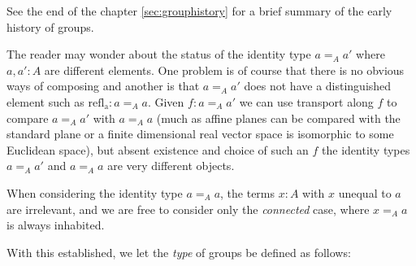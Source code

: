 See the end of the chapter \cref{sec:grouphistory} for a brief summary of the early history of groups.
\begin{remark}
  The reader may wonder about the status of the identity type $a=_Aa'$ where $a,a':A$ are different elements.  One problem is of course that there is no obvious ways of composing and another is that $a=_Aa'$ does not have a distinguished element such as $\mathrm{refl{}_a}:a=_Aa$.
Given $f:a=_Aa'$ we can use transport along $f$ to compare $a=_Aa'$ with $a=_Aa$ (much as affine planes can be compared with the standard plane or a finite dimensional real vector space is isomorphic to some Euclidean space), but absent existence and choice of such an $f$ the identity types $a=_Aa'$ and $a=_Aa$ are very different objects.
\end{remark}


\begin{remark}
  When considering the identity type $a=_Aa$, the terms $x:A$ with $x$ unequal to $a$ are irrelevant, and we are free to consider only the \emph{connected} case, \ie where $x=_Aa$ is always inhabited.
\end{remark}


With this established, we let the \emph{type} of groups be defined as follows:

